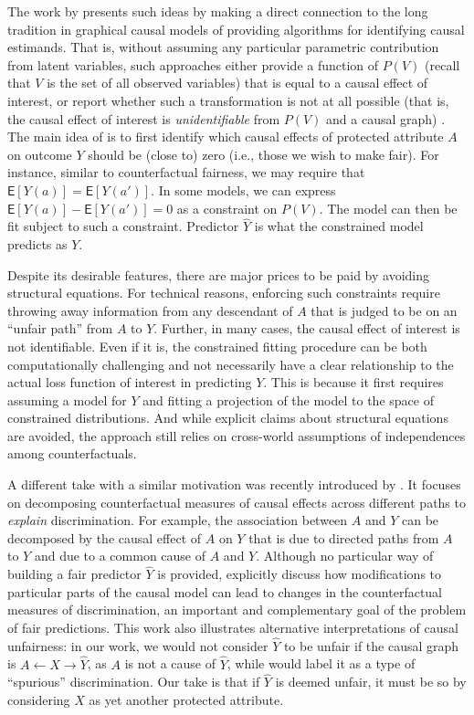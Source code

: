 \documentclass{article}
\begin{document}
The work by \cite{ilya:18} presents such ideas by making a direct
connection to the long tradition in graphical causal models of
providing algorithms for identifying causal estimands. That is,
without assuming any particular parametric contribution from latent
variables, such approaches either provide a function of $P(V)$ (recall that $V$ is the set of all observed variables) that is
equal to a causal effect of interest, or report whether such a
transformation is not at all possible (that is, the causal effect of
interest is \emph{unidentifiable} from $P(V)$ and a causal graph)
\cite{pearl:00}. The main idea of \cite{ilya:18} is to first identify which causal effects of protected attribute $A$ on outcome $Y$
should be (close to) zero (i.e., those we wish to make fair). For instance, similar to counterfactual fairness,
we may require that $\mathsf E[Y(a)] = \mathsf E[Y(a')]$. In some models,
we can express $\mathsf E[Y(a)] - \mathsf E[Y(a')] = 0$ as a constraint on
$P(V)$. The model can then be fit subject to such a constraint.
Predictor $\hat Y$ is what the constrained model predicts as $Y$.

Despite its desirable features, there are major prices to be paid by
avoiding structural equations. For technical reasons, enforcing such
constraints require throwing away information from any descendant of
$A$ that is judged to be on an ``unfair path'' from $A$ to $Y$. Further, in many
cases, the causal effect of interest is not identifiable. Even if
it is, the constrained fitting procedure can be both computationally
challenging and not necessarily have a clear relationship to the actual
loss function of interest in predicting $Y$. This is because it first requires
assuming a model for $Y$ and fitting a projection of the model to the
space of constrained distributions. And while explicit claims about
structural equations are avoided, the approach still relies on
cross-world assumptions of independences among counterfactuals.

A different take with a similar motivation was recently introduced by
\cite{elias:18}.  It focuses on decomposing counterfactual measures of
causal effects across different paths to \emph{explain}
discrimination. For example, the association between $A$ and $Y$ can
be decomposed by the causal effect of $A$ on $Y$ that is due to
directed paths from $A$ to $Y$ and due to a common cause of $A$ and
$Y$. Although no particular way of building a fair predictor $\hat Y$
is provided, \cite{elias:18} explicitly discuss how modifications to
particular parts of the causal model can lead to changes in the
counterfactual measures of discrimination, an important and
complementary goal of the problem of fair predictions. This work
also illustrates alternative interpretations of causal unfairness: in
our work, we would not consider $\hat Y$ to be unfair if the causal
graph is $A \leftarrow X \rightarrow \hat Y$, as $A$ is not a cause of
$\hat Y$, while \cite{elias:18} would label it as a type of ``spurious''
discrimination.  Our take is that if $\hat Y$ is deemed unfair, it
must be so by considering $X$ as yet another protected attribute.
\end{document}
